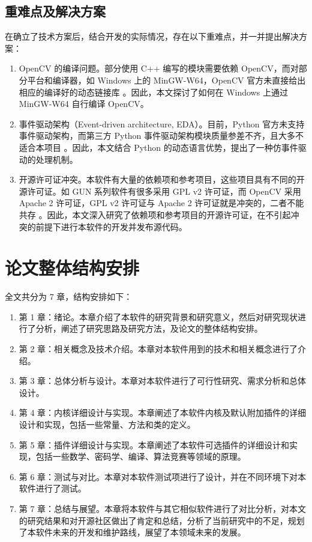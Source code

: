 \subsection{重难点及解决方案}

在确立了技术方案后，结合开发的实际情况，存在以下重难点，并一并提出解决方案：

\begin{enumerate}
    \item OpenCV 的编译问题。部分使用 C++ 编写的模块需要依赖 OpenCV，而对部分平台和编译器，如 Windows 上的 MinGW-W64，OpenCV 官方未直接给出相应的编译好的动态链接库 \cite{opencv_about}。因此，本文探讨了如何在 Windows 上通过 MinGW-W64 自行编译 OpenCV。
    \item 事件驱动架构（Event-driven architecture, EDA）。目前，Python 官方未支持事件驱动架构，而第三方 Python 事件驱动架构模块质量参差不齐，且大多不适合本项目 \cite{eda}。因此，本文结合 Python 的动态语言优势，提出了一种仿事件驱动的处理机制。
    \item 开源许可证冲突。本软件有大量的依赖项和参考项目，这些项目具有不同的开源许可证。如 GUN 系列软件有很多采用 GPL v2 许可证，而 OpenCV 采用 Apache 2 许可证，GPL v2 许可证与 Apache 2 许可证就是冲突的，二者不能共存 \cite{opencv_about}。因此，本文深入研究了依赖项和参考项目的开源许可证，在不引起冲突的前提下进行本软件的开发并发布源代码。
\end{enumerate}

\section{论文整体结构安排}

全文共分为 7 章，结构安排如下：

\begin{enumerate}
    \item 第 1 章：绪论。本章介绍了本软件的研究背景和研究意义，然后对研究现状进行了分析，阐述了研究思路及研究方法，及论文的整体结构安排。
    \item 第 2 章：相关概念及技术介绍。本章对本软件用到的技术和相关概念进行了介绍。
    \item 第 3 章：总体分析与设计。本章对本软件进行了可行性研究、需求分析和总体设计。
    \item 第 4 章：内核详细设计与实现。本章阐述了本软件内核及默认附加插件的详细设计和实现，包括一些常量、方法和类的定义。
    \item 第 5 章：插件详细设计与实现。本章阐述了本软件可选插件的详细设计和实现，包括一些数学、密码学、编译、算法竞赛等领域的原理。
    \item 第 6 章：测试与对比。本章对本软件测试项进行了设计，并在不同环境下对本软件进行了测试。
    \item 第 7 章：总结与展望。本章将本软件与其它相似软件进行了对比分析，对本文的研究结果和对开源社区做出了肯定和总结，分析了当前研究中的不足，规划了本软件未来的开发和维护路线，展望了本领域未来的发展。
\end{enumerate}
